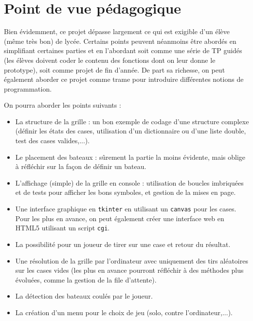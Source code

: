 \chapter{Point de vue pédagogique}

Bien évidemment, ce projet dépasse largement ce qui est exigible d'un élève (même très bon) de lycée. Certains points peuvent néanmoins être abordés en simplifiant certaines parties et en l'abordant soit comme une série de TP guidés (les élèves doivent coder le contenu des fonctions dont on leur donne le prototype), soit comme projet de fin d'année. De part sa richesse, on peut également aborder ce projet comme trame pour introduire différentes notions de programmation. 

\medskip

On pourra aborder les points suivants :
\begin{itemize}
\item La structure de la grille : un bon exemple de codage d'une structure complexe (définir les états des cases, utilisation d'un dictionnaire ou d'une liste double, test des cases valides,...).
\item Le placement des bateaux : sûrement la partie la moins évidente, mais oblige à réfléchir sur la façon de définir un bateau.
\item L'affichage (simple) de la grille en console : utilisation de boucles imbriquées et de tests pour afficher les bons symboles, et gestion de la mises en page.
\item Une interface graphique en \texttt{tkinter} en utilisant un \texttt{canvas} pour les cases. Pour les plus en avance, on peut également créer une interface web en HTML5 utilisant un script \texttt{cgi}.
\item La possibilité pour un joueur de tirer sur une case et retour du résultat.
\item Une résolution de la grille par l'ordinateur avec uniquement des tirs aléatoires sur les cases vides (les plus en avance pourront réfléchir à des méthodes plus évoluées, comme la gestion de la file d'attente).
\item La détection des bateaux coulés par le joueur.
\item La création d'un menu pour le choix de jeu (solo, contre l'ordinateur,...).
\end{itemize}

\medskip

